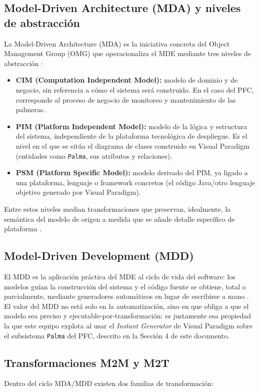 \documentclass[11pt,a4paper]{article}
\begin{document}
\subsection{Model-Driven Architecture (MDA) y niveles de abstracción}
\label{sec:mda}
La Model-Driven Architecture (MDA) es la iniciativa concreta del Object Management Group (OMG) que operacionaliza el MDE mediante tres niveles de abstracción \cite{omg2014mda}:
 
\begin{itemize}
  \item \textbf{CIM (Computation Independent Model):} modelo de dominio y de negocio, sin referencia a cómo el sistema será construido. En el caso del PFC, corresponde al proceso de negocio de monitoreo y mantenimiento de las palmeras.
  \item \textbf{PIM (Platform Independent Model):} modelo de la lógica y estructura del sistema, independiente de la plataforma tecnológica de despliegue. Es el nivel en el que se sitúa el diagrama de clases construido en Visual Paradigm (entidades como \texttt{Palma}, sus atributos y relaciones).
  \item \textbf{PSM (Platform Specific Model):} modelo derivado del PIM, ya ligado a una plataforma, lenguaje o framework concretos (el código Java/otro lenguaje objetivo generado por Visual Paradigm).
\end{itemize}
 
Entre estos niveles median transformaciones que preservan, idealmente, la semántica del modelo de origen a medida que se añade detalle específico de plataforma \cite{omg2014mda, omg2017uml}.

\subsection{Model-Driven Development (MDD)}
\label{sec:mdd}
El MDD es la aplicación práctica del MDE al ciclo de vida del software: los modelos guían la construcción del sistema y el código fuente se obtiene, total o parcialmente, mediante generadores automáticos en lugar de escribirse a mano \cite{selic2003}. El valor del MDD no está solo en la automatización, sino en que obliga a que el modelo sea preciso y ejecutable-por-transformación: es justamente esa propiedad la que este equipo explota al usar el \textit{Instant Generator} de Visual Paradigm sobre el subsistema \texttt{Palma} del PFC, descrito en la Sección 4 de este documento.
 

\subsection{Transformaciones M2M y M2T}
\label{sec:m2m-m2t}
Dentro del ciclo MDA/MDD existen dos familias de transformación:
 
\end{document}
